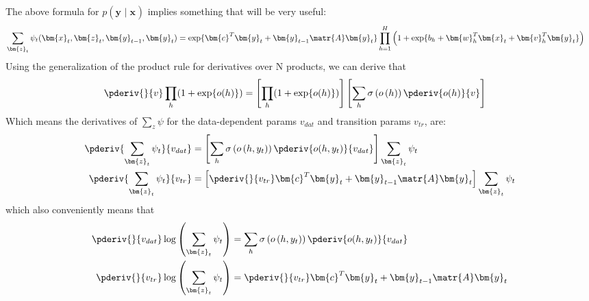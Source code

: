 \documentclass[11pt]{article}
\renewcommand\vec[2][]{\bm{#2}_{#1}}
\begin{document}
The above formula for $p(\vec y \mid \vec x)$ implies something that will be very useful:
\begin{align}
	\sum_{\vec[t]{z}} \psi_t(\vec[t]{x}, \vec[t]{z}, \vec[t-1]{y}, \vec[t]{y}) 
		&= 	\exp\{ \vec{c}^T \vec[t]{y} + \vec[t-1]{y}\matr{A}\vec[t]{y}   \}  
		\prod_{h = 1}^{H} \left( 1 + \exp\{ b_h + \vec[h]{w}^T \vec[t]{x} + \vec[h]{v}^T \vec[t]{y}  \} \right)
\end{align}
Using the generalization of the product rule for derivatives over N products, we can derive that
\begin{align}
 \pderiv{}{v} \prod_h (1 + \exp\{ o(h) \}) &= \left[ \prod_h (1 + \exp\{ o(h) \})\right] \left[ \sum_h \sigma\left(o\left(h\right)\right) \pderiv{o(h)}{v} \right]
\end{align}
Which means the derivatives of $\sum_z \psi$ for the data-dependent params $v_{dat}$ and transition params $v_{tr}$, are:
\begin{align}
	\pderiv{\sum_{\vec[t]{z}} \psi_t}{v_{dat}} 
		&=  \left[ \sum_h \sigma\left(o\left(h, y_t\right)\right) \pderiv{o(h, y_t)}{v_{dat}} \right]  \sum_{\vec[t]{z}} \psi_t \\
	\pderiv{\sum_{\vec[t]{z}} \psi_t}{v_{tr}}
		&= \left[ \pderiv{}{v_{tr}}  \vec{c}^T \vec[t]{y} + \vec[t-1]{y}\matr{A}\vec[t]{y} \right] \sum_{\vec[t]{z}} \psi_t 
\end{align}
which also conveniently means that
\begin{align}
	\pderiv{}{v_{dat}} \log\left( \sum_{\vec[t]{z}} \psi_t \right) 
		&=  \sum_h \sigma\left(o\left(h, y_t\right)\right) \pderiv{o(h, y_t)}{v_{dat}} \\
	\pderiv{}{v_{tr}} \log\left( \sum_{\vec[t]{z}} \psi_t \right) 
		&=  \pderiv{}{v_{tr}}  \vec{c}^T \vec[t]{y} + \vec[t-1]{y}\matr{A}\vec[t]{y} 
\end{align}
 
\end{document}
